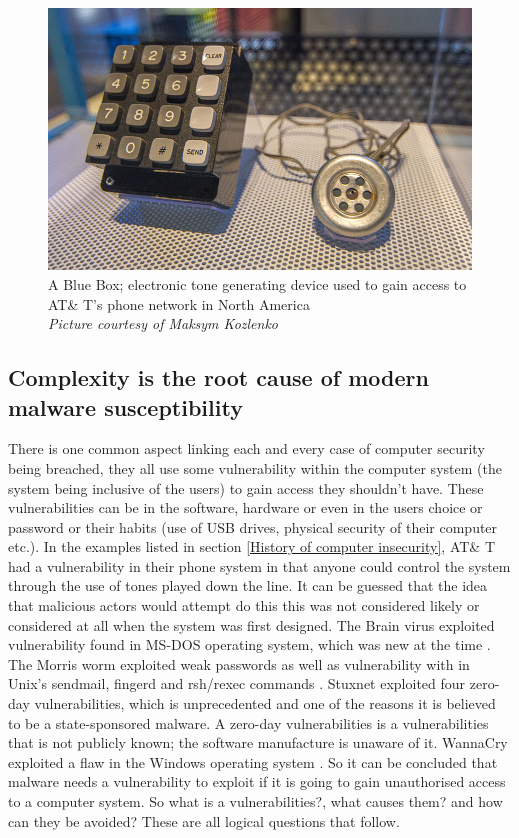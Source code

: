 \begin{figure} \begin{center}
\includegraphics[width=0.8\linewidth]{pics/blue_box} 
\end{center} 
\caption{A Blue Box; electronic tone generating device used to gain access to AT\& T's phone network in North America\\ \textit{\small{Picture courtesy of Maksym Kozlenko}}}
\label{blue_box}
\end{figure}


\subsection{Complexity is the root cause of modern malware susceptibility} 
\label{subsec: Complexity as the root cause of modern malware susceptibility}
There is one common aspect linking each and every case of computer security being breached, they all use some vulnerability within the computer system (the system being inclusive of the users) to gain access they shouldn't have. These vulnerabilities can be in the software, hardware or even in the users choice or password or their habits (use of USB drives, physical security of their computer etc.). In the examples listed in section \ref{History of computer insecurity}, AT\& T had a vulnerability in their phone system in that anyone could control the system through the use of tones played down the line. It can be guessed that the idea that malicious actors would attempt do this this was not considered likely or considered at all when the system was first designed. The Brain virus exploited vulnerability found in MS-DOS operating system, which was new at the time \cite{RN86}. The Morris worm exploited weak passwords as well as vulnerability with in Unix's sendmail, fingerd and rsh/rexec commands 
\cite{RN86}. Stuxnet exploited four zero-day vulnerabilities, which is unprecedented and one of the reasons it is believed to be a state-sponsored malware\cite{RN91}. A zero-day vulnerabilities is a vulnerabilities that is not publicly known; the software manufacture is unaware of it. WannaCry exploited a flaw in the Windows operating system \cite{RN94}. So it can be concluded that malware needs a vulnerability to exploit if it is going to gain unauthorised access to a computer system. So what is a vulnerabilities?, what causes them? and how can they be avoided? These are all logical questions that follow. 

